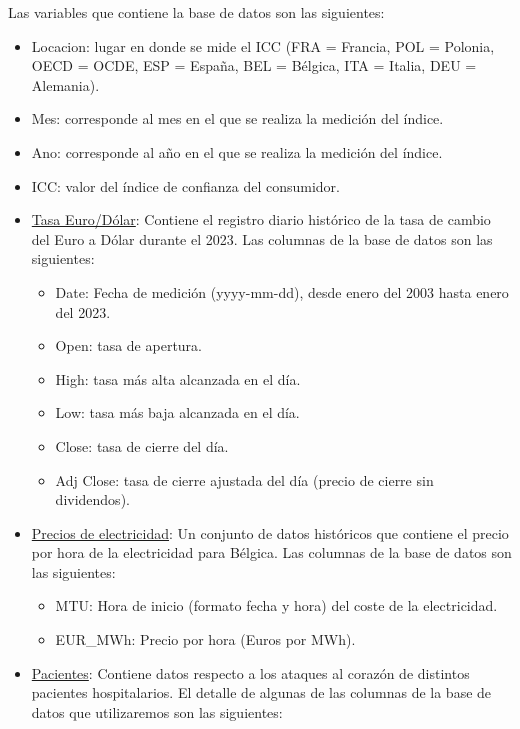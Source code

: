 \documentclass[
  11pt,
]{book}
\providecommand{\tightlist}{%
  \setlength{\itemsep}{0pt}\setlength{\parskip}{0pt}}
\theoremstyle{definition}
\theoremstyle{definition}
\theoremstyle{definition}
\theoremstyle{definition}
\theoremstyle{remark}
\begin{document}
Las variables que contiene la base de datos son las siguientes:

\begin{itemize}
\item
  Locacion: lugar en donde se mide el ICC (FRA = Francia, POL = Polonia, OECD = OCDE, ESP = España, BEL = Bélgica, ITA = Italia, DEU = Alemania).
\item
  Mes: corresponde al mes en el que se realiza la medición del índice.
\item
  Ano: corresponde al año en el que se realiza la medición del índice.
\item
  ICC: valor del índice de confianza del consumidor.
\item
  \label{TasaEURUSD}\href{https://raw.githubusercontent.com/Dfranzani/Bases-de-datos-para-cursos/main/2023-1/Tasa\%2Beuro\%2Bdolar\%2Bhistorica2023.csv}{Tasa Euro/Dólar}: Contiene el registro diario histórico de la tasa de cambio del Euro a Dólar durante el 2023. Las columnas de la base de datos son las siguientes:

  \begin{itemize}
  \tightlist
  \item
    Date: Fecha de medición (yyyy-mm-dd), desde enero del 2003 hasta enero del 2023.
  \item
    Open: tasa de apertura.
  \item
    High: tasa más alta alcanzada en el día.
  \item
    Low: tasa más baja alcanzada en el día.
  \item
    Close: tasa de cierre del día.
  \item
    Adj Close: tasa de cierre ajustada del día (precio de cierre sin dividendos).
  \end{itemize}
\item
  \label{PreciosElectricidad}\href{https://raw.githubusercontent.com/Dfranzani/Bases-de-datos-para-cursos/main/2024-1/Belgian\%20Electricity\%20Prices.csv}{Precios de electricidad}: Un conjunto de datos históricos que contiene el precio por hora de la electricidad para Bélgica. Las columnas de la base de datos son las siguientes:

  \begin{itemize}
  \tightlist
  \item
    MTU: Hora de inicio (formato fecha y hora) del coste de la electricidad.
  \item
    EUR\_MWh: Precio por hora (Euros por MWh).
  \end{itemize}
\item
  \label{Pacientes}\href{https://raw.githubusercontent.com/Dfranzani/Bases-de-datos-para-cursos/main/2023-1/Heart+complete.csv}{Pacientes}: Contiene datos respecto a los ataques al corazón de distintos pacientes hospitalarios. El detalle de algunas de las columnas de la base de datos que utilizaremos son las siguientes:


\end{itemize}
\end{document}
